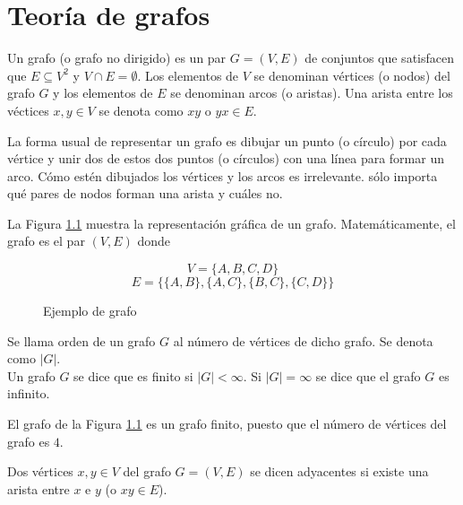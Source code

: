 \chapter{Teoría de grafos}

\begin{defi}
Un grafo (o grafo no dirigido) es un par $G = (V,E)$ de conjuntos que satisfacen que $E \subseteq V^2$ y $V \cap E = \emptyset$. Los elementos de $V$ se denominan vértices (o nodos) del grafo $G$ y los elementos de $E$ se denominan arcos (o aristas). Una arista entre los véctices $x, y \in V$ se denota como $xy$ o $yx \in E$.
\end{defi}

La forma usual de representar un grafo es dibujar un punto (o círculo) por cada vértice y unir dos de estos dos puntos (o círculos) con una línea para formar un arco. Cómo estén dibujados los vértices y los arcos es irrelevante. sólo importa qué pares de nodos forman una arista y cuáles no.

\begin{ejemplo}

La Figura \ref{fig:grafo} muestra la representación gráfica de un grafo. Matemáticamente, el grafo es el par $(V, E)$ donde

\[ V = \{A, B, C, D\} \]
\[ E = \{\{A,B\},\{A,C\},\{B,C\},\{C,D\} \} \]

\begin{figure}[htb]
\centering
\ejemplografo
\caption{Ejemplo de grafo}
\label{fig:grafo}
\end{figure}

\end{ejemplo}

\begin{defi}
Se llama orden de un grafo $G$ al número de vértices de dicho grafo. Se denota como $|G|$.\\
Un grafo $G$ se dice que es finito si $|G| < \infty$. Si $|G| = \infty$ se dice que el grafo $G$ es infinito.
\end{defi}

\begin{ejemplo}
El grafo de la Figura \ref{fig:grafo} es un grafo finito, puesto que el número de vértices del grafo es $4$.
\end{ejemplo}

\begin{defi}
Dos vértices $x,y \in V$ del grafo $G = (V,E)$ se dicen adyacentes si existe una arista entre $x$ e $y$ (o $xy \in E$).
\end{defi}

